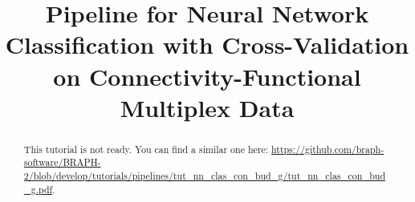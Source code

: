 \documentclass[justified]{tufte-handout}
\title[Classification Cross-Validation Connectivity-Functional Multiplex Data]{Pipeline for Neural Network Classification with Cross-Validation on Connectivity-Functional Multiplex Data}
\begin{document}
\maketitle

\begin{abstract}
\noindent
This tutorial is not ready. You can find a similar one here: \url{https://github.com/braph-software/BRAPH-2/blob/develop/tutorials/pipelines/tut_nn_clas_con_bud_g/tut_nn_clas_con_bud_g.pdf}.
\end{abstract}
\end{document}
